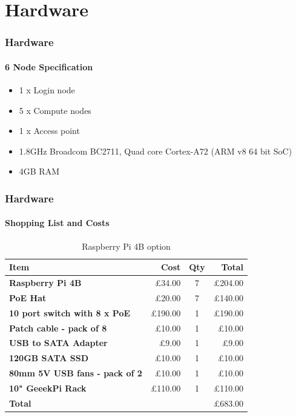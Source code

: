 \section{Hardware}

\begin{frame}
	\frametitle{Hardware}
	\framesubtitle{6 Node Specification}
	\begin{itemize}
		\item 1 x Login node
		\item 5 x Compute nodes
		\item 1 x Access point
		\item 1.8GHz Broadcom BC2711, Quad core Cortex-A72 (ARM v8 64 bit SoC)
		\item 4GB RAM
		\
	\end{itemize}
\end{frame}

\begin{frame}
	\frametitle{Hardware}
	\framesubtitle{Shopping List and Costs}
	\begin{table}[]
		\begin{tabular}{l|rcr}
			\hline
			\textbf{Item} & \textbf{Cost} & \textbf{Qty} & \textbf{Total} \\ \hline
			\textbf{Raspberry Pi 4B} & £34.00 & 7 & £204.00\\ 
			\textbf{PoE Hat} & £20.00 & 7 & £140.00\\ 
			\textbf{10 port switch with 8 x PoE} & £190.00 & 1 & £190.00\\
			\textbf{Patch cable - pack of 8} & £10.00 & 1 & £10.00\\
			\textbf{USB to SATA Adapter} & £9.00 & 1 & £9.00\\
			\textbf{120GB SATA SSD} & £10.00 & 1 & £10.00\\
			\textbf{80mm 5V USB fans - pack of 2} & £10.00 & 1 & £10.00\\
			\textbf{10" GeeekPi Rack} & £110.00 & 1 & £110.00\\
			
			\hline
			\textbf{Total} & & & £683.00\\
			\hline
		\end{tabular}
		\caption{Raspberry Pi 4B option}
		\label{tab:1}
	\end{table}
\end{frame}


